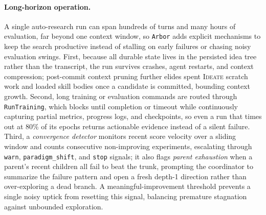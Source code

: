 \documentclass{llmxive}
\providecommand{\arbor}{\texttt{Arbor}}
\begin{document}
\paragraph{Long-horizon operation.}
A single auto-research run can span hundreds of turns and many hours of
evaluation, far beyond one context window, so \arbor{} adds explicit mechanisms
to keep the search productive instead of stalling on early failures or chasing
noisy evaluation swings. First, because all durable state lives in the persisted
idea tree rather than the transcript, the run survives crashes, agent restarts,
and context compression; post-commit context pruning further elides spent
\textsc{Ideate} scratch work and loaded skill bodies once a candidate is
committed, bounding context growth. Second, long training or evaluation commands
are routed through \texttt{RunTraining}, which blocks until completion or timeout
while continuously capturing partial metrics, progress logs, and checkpoints, so
even a run that times out at 80\% of its epochs returns actionable evidence
instead of a silent failure. Third, a \emph{convergence detector} monitors
recent score velocity over a sliding window and counts consecutive
non-improving experiments, escalating through \texttt{warn}, \texttt{paradigm\_shift},
and \texttt{stop} signals; it also flags \emph{parent exhaustion} when a parent's
recent children all fail to beat the trunk, prompting the coordinator to
summarize the failure pattern and open a fresh depth-1 direction rather than
over-exploring a dead branch. A meaningful-improvement threshold prevents a
single noisy uptick from resetting this signal, balancing premature stagnation
against unbounded exploration.
\end{document}
